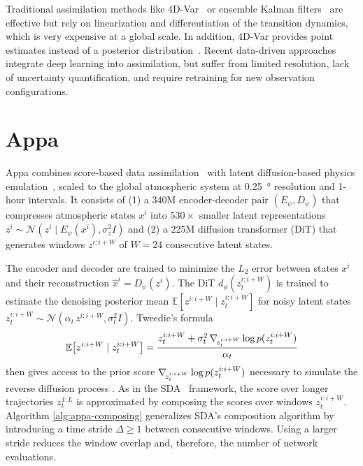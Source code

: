 Traditional assimilation methods like 4D-Var~\cite{lorenc1986analysis, ledimet1986variational, tremolet2006accounting, tremolet2007modelerror, fisher2011weakconstraint} or ensemble Kalman filters~\cite{evensen1994sequential, bishop2001adaptive, anderson2007adaptive, hunt2007efficient, evensen2009data} are effective but rely on linearization and differentiation of the transition dynamics, which is very expensive at a global scale. In addition, 4D-Var provides point estimates instead of a posterior distribution~\cite{carrassi2018data}. Recent data-driven approaches~\cite{cheng2023machine, huang2024diffda, xu2025fuxida, fablet2021joint, andrychowicz2023deep} integrate deep learning into assimilation, but suffer from limited resolution, lack of uncertainty quantification, and require retraining for new observation configurations.

\section{Appa} \label{sec:appa}

Appa combines score-based data assimilation~\cite{rozet2023scorebased, rozet2023scorebaseda, schmidt2025generative} with latent diffusion-based physics emulation~\cite{rozet2025lost}, scaled to the global atmospheric system at \qty{0.25}{\degree} resolution and 1-hour intervals. It consists of (1) a 340M encoder-decoder pair $(E_\psi, D_\psi)$ that compresses atmospheric states $x^i$ into $530\times$ smaller latent representations $z^i \sim \mathcal{N}(z^i \mid E_\psi(x^i), \sigma_z^2 I)$ and (2) a 225M diffusion transformer (DiT) \cite{peebles2023scalable} that generates windows $z^{i:i+W}$ of $W = 24$ consecutive latent states.

The encoder and decoder are trained to minimize the $L_2$ error between states $x^i$ and their reconstruction $\hat{x}^i = D_\psi(z^i)$. The DiT $d_\phi(z^{i:i+W}_t)$ is trained to estimate the denoising posterior mean $\mathbb{E}[z^{i:i+W} \mid z^{i:i+W}_t]$ for noisy latent states $z^{i:i+W}_t \sim \mathcal{N}(\alpha_t \, z^{i:i+W}, \sigma_t^2 I)$. Tweedie's formula~\cite{tweedie1947functions, efron2011tweedies, kim2021noise2score}
\begin{equation}
    \mathbb{E} \big[z^{i:i+W} \mid z^{i:i+W}_t\big] = \frac{z^{i:i+W}_t + \sigma^2_t \, \nabla_{\!{z^{i:i+W}_t}} \log p(z^{i:i+W}_t)}{\alpha_t}
\end{equation}
then gives access to the prior score $\nabla_{\!{z^{i:i+W}_t}} \log p(z^{i:i+W}_t)$ necessary to simulate the reverse diffusion process \cite{song2021scorebased}. As in the SDA~\cite{rozet2023scorebased, rozet2023scorebaseda} framework, the score over longer trajectories $z^{1:L}_t$ is approximated by composing the scores over windows $z^{i:i+W}_t$. Algorithm \ref{alg:appa-composing} generalizes SDA's composition algorithm by introducing a time stride $\Delta \geq 1$ between consecutive windows. Using a larger stride reduces the window overlap and, therefore, the number of network evaluations.

